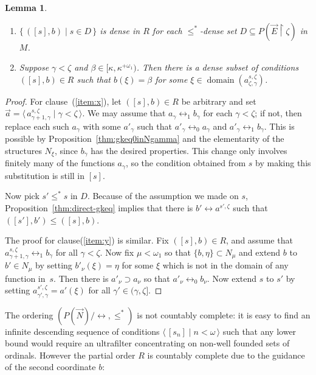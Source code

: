 \documentclass[
twoside,
]{article}
\newtheorem{lemma}[theorem]{Lemma}
\theoremstyle{definition}
\theoremstyle{remark}
\newcommand\gkeq{\leftrightarrow}
\newcommand\mgkeq{/{\gkeq}}
\newcommand{\sing}[1]{\{#1\}}
\newcommand{\set}[1]{\{\,#1\,\}}
\newcommand{\xset}[2]{\set{#1\mid#2}}
\newcommand{\pair}[1]{\langle#1\rangle}
\newcommand{\seq}[1]{\pair{\,#1\,}}
\newcommand{\xseq}[2]{\seq{#1\mid#2}}
\newcommand{\restrict}{{\upharpoonright}}
\DeclareMathOperator{\domain}{domain}
\begin{document}
  \begin{lemma}\label{thm:density-in-R}
    \begin{enumerate}
    \item \label{item:x} $\xset{([s],b)}{s\in D}$ is dense in $R$ for
      each $\leq^*$-dense set $D\subseteq P(\vec E\restrict\zeta)$ in
      $M$.
    \item
      \label{item:y}
      Suppose $\gamma<\zeta$ and $\beta\in [\kappa,\kappa^{+\omega_1})$.
      Then there is a dense subset of conditions $([s],b)\in R$ such
      that $b(\xi)=\beta$ for some $\xi\in\domain(a^{s,\zeta}_{\zeta,\gamma})$.
    \end{enumerate}
  \end{lemma}

  \begin{proof}
    For clause~(\ref{item:x}), 
    let
    $([s],b)\in R$ be arbitrary and set $\vec
    a=\xseq{a^{s,\zeta}_{\gamma+1,\gamma}}{\gamma<\zeta}$.  We may assume that
    $a_{\gamma}\gkeq_{1}b_{\gamma}$ for each $\gamma<\zeta$; if not,
    then replace each such $a_{\gamma}$ with some $a'_{\gamma}$ such that
    $a'_{\gamma}\gkeq_{0}a_{\gamma}$ and
    $a'_{\gamma}\gkeq_{1}b_{\gamma}$.  This is possible by
    Proposition~\ref{thm:gkeq0inNgamma} and the
    elementarity of the structures $N_{\xi}$, since $b_{\gamma}$ has
    the desired properties.  This change
    only involves finitely many of the functions $a_{\gamma}$, so the
    condition obtained from $s$ by making this substitution is still
    in $[s]$.

    Now pick $s'\leq^* s$ in $D$.  Because of the assumption we made
    on $s$, Proposition~\ref{thm:direct-gkeq} implies that there is
    $b'\gkeq a^{s',\zeta}$ such that
    $([s'],b')\leq([s],b)$.
    \smallskip{}

    The proof for clause(\ref{item:y}) is 
    similar.  Fix $([s],b)\in R$, and assume that
    $a^{s,\zeta}_{\gamma+1,\gamma}\gkeq_{1}b_{\gamma}$ for all $\gamma<\zeta$. 
    Now fix $\mu<\omega_1$ so that $\sing{b,\eta}\subset N_{\mu}$ and 
    extend $b$ to $b'\in N_\mu$ by setting $b'_\nu(\xi)=\eta$ for some 
    $\xi$ which is not  in the domain of any function in~$s$.    Then there
    is $ a'_{\nu}\supset  a_{\nu}$ so that 
    $ a'_{\nu}\gkeq_{0} b_{\nu}$.   Now extend $s$ to $s'$ by
    setting $a^{s',\zeta}_{\gamma',\gamma}=a'(\xi)$ for all $\gamma'\in(\gamma,\zeta]$.
  \end{proof}

  The ordering $(P(\vec N)\mgkeq, \leq^*)$ is not countably complete:
  it is easy to find an infinite descending sequence of conditions
  $\seq{[s_n]\mid n<\omega}$ such that any lower bound would require an ultrafilter
  concentrating on non-well founded sets of ordinals.  However the
  partial order $R$ is countably complete due to the guidance of the
  second coordinate $b$:
\end{document}
